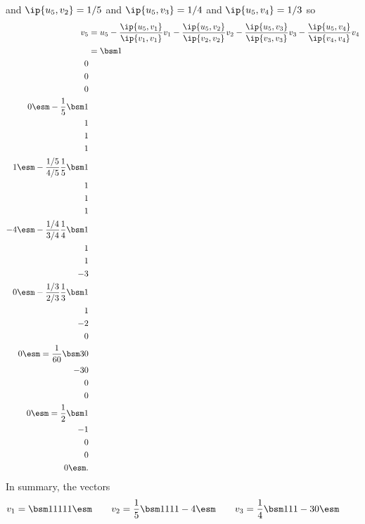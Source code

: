 \begin{solution}
 and $\ip{u_5,v_2}=1/5$ and $\ip{u_5,v_3}=1/4$ and
 $\ip{u_5,v_4}=1/3$ so 
 \begin{align*}
   v_5 &= u_5 - \frac{\ip{u_5,v_1}}{\ip{v_1,v_1}}v_1
              - \frac{\ip{u_5,v_2}}{\ip{v_2,v_2}}v_2
              - \frac{\ip{u_5,v_3}}{\ip{v_3,v_3}}v_3
              - \frac{\ip{u_5,v_4}}{\ip{v_4,v_4}}v_4 \\
   &= \bsm 1\\ 0\\ 0\\ 0\\ 0\esm 
      - \frac{1}{5} \bsm 1\\1\\1\\1\\1 \esm
      - \frac{1/5}{4/5} \frac{1}{5} \bsm 1\\1\\1\\1\\-4 \esm
      - \frac{1/4}{3/4} \frac{1}{4} \bsm 1\\1\\1\\-3\\0 \esm
      - \frac{1/3}{2/3} \frac{1}{3} \bsm 1\\1\\-2\\0\\0 \esm
    = \frac{1}{60} \bsm 30\\ -30\\ 0\\ 0\\ 0\esm 
    = \frac{1}{2} \bsm 1\\ -1\\ 0\\ 0\\ 0\esm .
 \end{align*}
 In summary, the vectors 
 \[ v_1 = \bsm 1\\1\\1\\1\\1\esm \hspace{2em}
    v_2 = \frac{1}{5}\bsm 1\\1\\1\\1\\-4\esm \hspace{2em}
    v_3 = \frac{1}{4}\bsm 1\\1\\1\\-3\\0\esm \hspace{2em}
\]
\end{solution}
